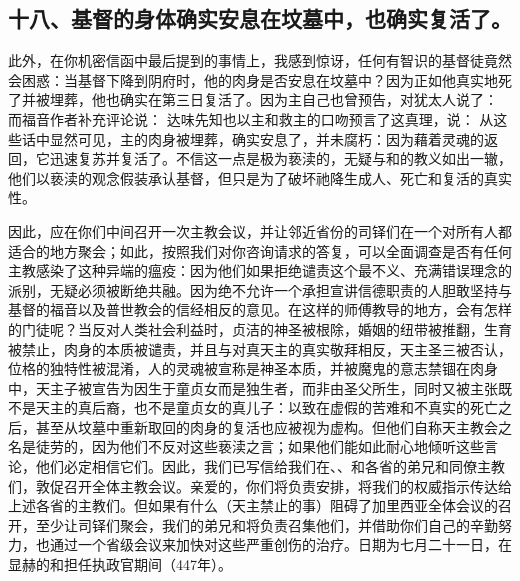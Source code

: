 
\subsection{十八、基督的身体确实安息在坟墓中，也确实复活了。}

此外，在你机密信函中最后提到的事情上，我感到惊讶，任何有智识的基督徒竟然会困惑：当基督下降到阴府时，他的肉身是否安息在坟墓中？因为正如他真实地死了并被埋葬，他也确实在第三日复活了。因为主自己也曾预告，对犹太人说了：  而福音作者补充评论说： 达味先知也以主和救主的口吻预言了这真理，说： 从这些话中显然可见，主的肉身被埋葬，确实安息了，并未腐朽：因为藉着灵魂的返回，它迅速复苏并复活了。不信这一点是极为亵渎的，无疑与和的教义如出一辙，他们以亵渎的观念假装承认基督，但只是为了破坏祂降生成人、死亡和复活的真实性。\par

因此，应在你们中间召开一次主教会议，并让邻近省份的司铎们在一个对所有人都适合的地方聚会；如此，按照我们对你咨询请求的答复，可以全面调查是否有任何主教感染了这种异端的瘟疫：因为他们如果拒绝谴责这个最不义、充满错误理念的派别，无疑必须被断绝共融。因为绝不允许一个承担宣讲信德职责的人胆敢坚持与基督的福音以及普世教会的信经相反的意见。在这样的师傅教导的地方，会有怎样的门徒呢？当反对人类社会利益时，贞洁的神圣被根除，婚姻的纽带被推翻，生育被禁止，肉身的本质被谴责，并且与对真天主的真实敬拜相反，天主圣三被否认，位格的独特性被混淆，人的灵魂被宣称是神圣本质，并被魔鬼的意志禁锢在肉身中，天主子被宣告为因生于童贞女而是独生者，而非由圣父所生，同时又被主张既不是天主的真后裔，也不是童贞女的真儿子：以致在虚假的苦难和不真实的死亡之后，甚至从坟墓中重新取回的肉身的复活也应被视为虚构。但他们自称天主教会之名是徒劳的，因为他们不反对这些亵渎之言；如果他们能如此耐心地倾听这些言论，他们必定相信它们。因此，我们已写信给我们在、、和各省的弟兄和同僚主教们，敦促召开全体主教会议。亲爱的，你们将负责安排，将我们的权威指示传达给上述各省的主教们。但如果有什么（天主禁止的事）阻碍了加里西亚全体会议的召开，至少让司铎们聚会，我们的弟兄和将负责召集他们，并借助你们自己的辛勤努力，也通过一个省级会议来加快对这些严重创伤的治疗。日期为七月二十一日，在显赫的和担任执政官期间（447年）。\par


